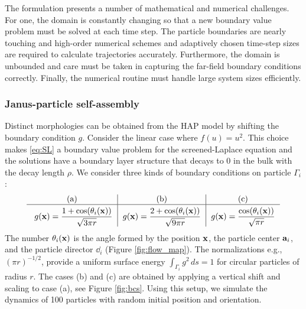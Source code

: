 
The formulation presents a number of mathematical and numerical
challenges. For one, the domain is constantly changing so that a new
boundary value problem must be solved at each time step. The particle
boundaries are nearly touching and high-order numerical
schemes and adaptively chosen time-step sizes
are required to calculate trajectories accurately.
Furthermore, the domain is unbounded and care must be taken 
in capturing the far-field boundary conditions correctly. 
Finally, the numerical routine must handle large system sizes
efficiently.


\subsubsection{Janus-particle self-assembly} 
Distinct morphologies can be obtained from 
the HAP model by shifting the boundary condition $g$.
Consider the linear case where $f(u) = u^2$.
This choice makes \eqref{eq:SL} a boundary value
problem for the screened-Laplace equation
and the solutions have a boundary layer structure that decays to $0$ in the
bulk with the decay length $\rho$.
We consider three kinds of boundary conditions
on particle $\Gamma_i$:
\begin{equation}
  \label{eq:bcs}
  \begin{tabular}{c|c|c}
     \text{(a)} & \text{(b)} & \text{(c)} \\
    \hline
    \rule{0pt}{4ex} 
      $g(\mathbf{x}) = \displaystyle \frac{1+\cos (\theta_i(\xx))}{\sqrt{3\pi r}}$
    & $g(\mathbf{x}) = \displaystyle \frac{2+\cos (\theta_i(\xx))}{\sqrt{9\pi r}}$
    & $g(\mathbf{x}) = \displaystyle \frac{\cos (\theta_i(\xx))}{\sqrt{\pi r}}$
\end{tabular}
\end{equation}
  The number $\theta_i(\xx)$ is the angle formed by the position $\xx$, the
particle center $\aa_i$, and the particle director $\dd_i$ (Figure \ref{fig:flow_map}).
The normalizations e.g., $(\pi r)^{-1/2}$, provide a uniform
surface energy $\int_{\Gamma_i} g^2 \,ds = 1$ for circular particles
of radius $r$. 
The cases (b) and (c) are obtained by applying a vertical shift
and scaling to case (a), see Figure \ref{fig:bcs}.
Using this setup, we simulate the dynamics of 100 particles with random
initial position and orientation.

